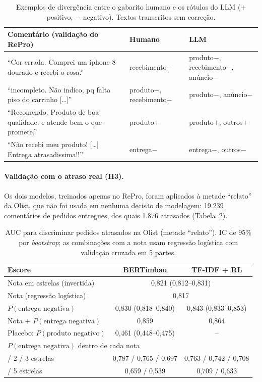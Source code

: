 \documentclass[a4paper, twocolumn, 11pt, twoside]{article}
\begin{document}
\begin{table}[htb]
\centering
\footnotesize
\setlength{\tabcolsep}{3pt}
\begin{tabular}{>{\raggedright\arraybackslash}p{}>{\raggedright\arraybackslash}p{}>{\raggedright\arraybackslash}p{}}
\toprule
Comentário (validação do RePro) & Humano & LLM \\
\midrule
``Cor errada. Comprei um iphone 8 dourado e recebi o rosa.'' & recebimento$-$ & produto$-$, recebimento$-$, anúncio$-$ \\
``incompleto. Não indico, pq falta piso do carrinho [\dots]'' & produto$-$, recebimento$-$ & produto$-$, anúncio$-$ \\
``Recomendo. Produto de boa qualidade. e atende bem o que promete.'' & produto$+$ & produto$+$, outros$+$ \\
``Não recebi meu produto! [\dots] Entrega atrasadissima!!'' & entrega$-$ & entrega$-$, outros$-$ \\
\bottomrule
\end{tabular}
\caption{Exemplos de divergência entre o gabarito humano e os rótulos do LLM ($+$ positivo, $-$ negativo). Textos transcritos sem correção.}
\label{tab:erros}
\end{table}

\paragraph{Validação com o atraso real (H3).} Os dois modelos, treinados apenas no RePro, foram aplicados à metade ``relato'' da Olist, que não foi usada em nenhuma decisão de modelagem: 19.239 comentários de pedidos entregues, dos quais 1.876 atrasados (Tabela~\ref{tab:atraso}).

\begin{table}[htb]
\centering
\small
\begin{tabular}{lcc}
\toprule
Escore & BERTimbau & TF-IDF + RL \\
\midrule
Nota em estrelas (invertida)            & \multicolumn{2}{c}{0,821 (0,812--0,831)} \\
Nota (regressão logística)              & \multicolumn{2}{c}{0,817} \\
$P(\text{entrega negativa})$            & 0,830 (0,818--0,840) & 0,843 (0,833--0,853) \\
Nota + $P(\text{entrega negativa})$     & 0,859 & 0,864 \\
Placebo: $P(\text{produto negativo})$   & 0,461 (0,448--0,475) & -- \\
\midrule
\multicolumn{3}{l}{$P(\text{entrega negativa})$ dentro de cada nota} \\
\quad 1 / 2 / 3 estrelas & 0,787 / 0,765 / 0,697 & 0,763 / 0,742 / 0,708 \\
\quad 4 / 5 estrelas     & 0,659 / 0,539         & 0,709 / 0,633 \\
\bottomrule
\end{tabular}
\caption{AUC para discriminar pedidos atrasados na Olist (metade ``relato''). IC de 95\% por \emph{bootstrap}; as combinações com a nota usam regressão logística com validação cruzada em 5 partes.}
\label{tab:atraso}
\end{table}
\end{document}
